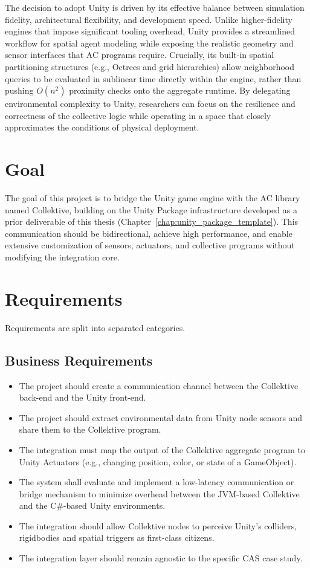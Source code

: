 The decision to adopt Unity is driven by its effective balance between simulation fidelity, architectural flexibility, and development speed. Unlike higher-fidelity engines that impose significant tooling overhead, Unity provides a streamlined workflow for spatial agent modeling while exposing the realistic geometry and sensor interfaces that \ac{AC} programs require. Crucially, its built-in spatial partitioning structures (e.g., Octrees and grid hierarchies) allow neighborhood queries to be evaluated in sublinear time directly within the engine, rather than pushing $O(n^2)$ proximity checks onto the aggregate runtime. By delegating environmental complexity to Unity, researchers can focus on the resilience and correctness of the collective logic while operating in a space that closely approximates the conditions of physical deployment.

\section{Goal}

The goal of this project is to bridge the Unity game engine with the \ac{AC} library named Collektive, building on the Unity Package infrastructure developed as a prior deliverable of this thesis (Chapter~\ref{chap:unity_package_template}). This communication should be bidirectional, achieve high performance, and enable extensive customization of sensors, actuators, and collective programs without modifying the integration core.

\section{Requirements}

Requirements are split into separated categories.

\subsection{Business Requirements}

\begin{itemize}
	\item The project should create a communication channel between the Collektive back-end and the Unity front-end.
	\item The project should extract environmental data from Unity node sensors and share them to the Collektive program.
	\item The integration must map the output of the Collektive aggregate program to Unity Actuators (e.g., changing position, color, or state of a GameObject).
	\item The system shall evaluate and implement a low-latency communication or bridge mechanism to minimize overhead between the JVM-based Collektive and the C\#-based Unity environments.
	\item The integration should allow Collektive nodes to perceive Unity's colliders, rigidbodies and spatial triggers as first-class citizens.
	\item The integration layer should remain agnostic to the specific \ac{CAS} case study.
\end{itemize}

